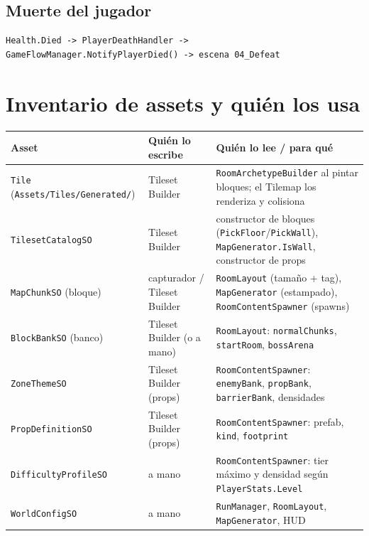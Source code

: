 \documentclass[11pt,a4paper]{article}
\newcommand{\code}[1]{\texttt{#1}}
\begin{document}
\subsection{Muerte del jugador}

\begin{lstlisting}
Health.Died -> PlayerDeathHandler -> GameFlowManager.NotifyPlayerDied() -> escena 04_Defeat
\end{lstlisting}

\section{Inventario de assets y quién los usa}

\small
\begin{longtable}{@{}p{4.4cm}p{3.6cm}p{6.4cm}@{}}
\toprule
\textbf{Asset} & \textbf{Quién lo escribe} & \textbf{Quién lo lee / para qué} \\
\midrule
\endhead
\code{Tile} (\code{Assets/Tiles/Generated/}) & Tileset Builder & \code{RoomArchetypeBuilder} al pintar bloques; el Tilemap los renderiza y colisiona \\
\code{TilesetCatalogSO} & Tileset Builder & constructor de bloques (\code{PickFloor}/\code{PickWall}), \code{MapGenerator.IsWall}, constructor de props \\
\code{MapChunkSO} (bloque) & capturador / Tileset Builder & \code{RoomLayout} (tamaño + tag), \code{MapGenerator} (estampado), \code{RoomContentSpawner} (spawns) \\
\code{BlockBankSO} (banco) & Tileset Builder (o a mano) & \code{RoomLayout}: \code{normalChunks}, \code{startRoom}, \code{bossArena} \\
\code{ZoneThemeSO} & Tileset Builder (props) & \code{RoomContentSpawner}: \code{enemyBank}, \code{propBank}, \code{barrierBank}, densidades \\
\code{PropDefinitionSO} & Tileset Builder (props) & \code{RoomContentSpawner}: prefab, \code{kind}, \code{footprint} \\
\code{DifficultyProfileSO} & a mano & \code{RoomContentSpawner}: tier máximo y densidad según \code{PlayerStats.Level} \\
\code{WorldConfigSO} & a mano & \code{RunManager}, \code{RoomLayout}, \code{MapGenerator}, HUD \\
\bottomrule
\end{longtable}
\normalsize

\end{document}
